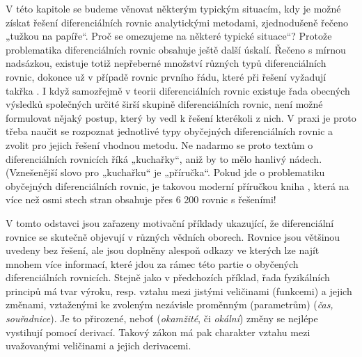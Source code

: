   V této kapitole se budeme věnovat některým typickým situacím, kdy je možné získat řešení
  diferenciálních rovnic analytickými metodami, zjednodušeně řečeno „tužkou na papíře“. Proč se
  omezujeme na některé typické situace“? Protože problematika diferenciálních rovnic obsahuje ještě
  další úskalí. Řečeno s mírnou nadsázkou, existuje totiž nepřeberné množství různých typů
  diferenciálních rovnic, dokonce už v případě rovnic prvního řádu, které při řešení vyžadují takřka
  . I když samozřejmě v teorii diferenciálních rovnic existuje řada
  obecných výsledků společných určité širší skupině diferenciálních rovnic, není možné formulovat
  nějaký  postup, který by vedl k řešení kterékoli z nich. V praxi je proto třeba
  naučit se rozpoznat jednotlivé typy obyčejných diferenciálních rovnic a zvolit pro jejich řešení
  vhodnou metodu. Ne nadarmo se proto textům o diferenciálních rovnicích říká „kuchařky“, aniž by to
  mělo hanlivý nádech. (Vznešenější slovo pro „kuchařku“ je „příručka“. Pokud jde o problematiku
  obyčejných diferenciálních rovnic, je takovou moderní příručkou kniha \cite{PolyaninZaitsev},
  která na více než osmi stech stran obsahuje přes 6 200 rovnic s řešeními!
  
    V tomto odstavci jsou zařazeny motivační příklady ukazující, že diferenciální rovnice se
    skutečně objevují v různých vědních oborech. Rovnice jsou většinou uvedeny bez řešení, ale jsou
    doplněny alespoň odkazy ve kterých lze najít mnohem více informací, které jdou za rámec této
    partie o obyčených diferenciálních rovnicích. Stejně jako v předchozích příklad, řada
    fyzikálních principů má tvar výroku, resp. vztahu mezi jistými veličinami (funkcemi) a jejich
    změnami, vztaženými ke zvoleným nezávisle proměnným (pa\-ra\-me\-trům) (\emph{čas, souřadnice}).
    Je to přirozené, neboť (\emph{okamžité}, či \emph{okální}) změny se nejlépe vystihují pomocí
    derivací. Takový zákon má pak charakter vztahu mezi uvažovanými veličinami a jejich derivacemi. 
    

